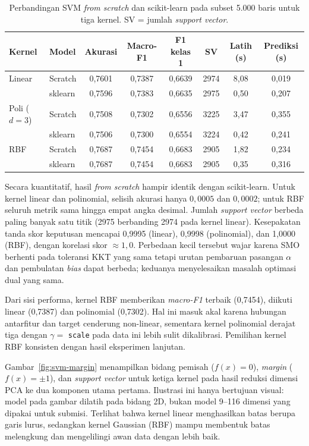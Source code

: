 \begin{table}[htbp]
  \centering
  \caption{Perbandingan SVM \textit{from scratch} dan scikit-learn pada subset
  5.000 baris untuk tiga kernel. SV = jumlah \textit{support vector}.}
  \label{tab:svm-kernel}
  \footnotesize
  \begin{tabular}{llcccccc}
    \toprule
    Kernel & Model & Akurasi & Macro-F1 & F1 kelas 1 & SV & Latih (s) & Prediksi (s) \\
    \midrule
    Linear  & Scratch & 0,7601 & 0,7387 & 0,6639 & 2974 & 8,08 & 0,019 \\
            & sklearn & 0,7596 & 0,7383 & 0,6635 & 2975 & 0,50 & 0,207 \\
    \midrule
    Poli ($d=3$) & Scratch & 0,7508 & 0,7302 & 0,6556 & 3225 & 3,47 & 0,355 \\
            & sklearn & 0,7506 & 0,7300 & 0,6554 & 3224 & 0,42 & 0,241 \\
    \midrule
    RBF     & Scratch & 0,7687 & 0,7454 & 0,6683 & 2905 & 1,82 & 0,234 \\
            & sklearn & 0,7687 & 0,7454 & 0,6683 & 2905 & 0,35 & 0,316 \\
    \bottomrule
  \end{tabular}
\end{table}

Secara kuantitatif, hasil \textit{from scratch} hampir identik dengan
scikit-learn. Untuk kernel linear dan polinomial, selisih akurasi hanya
$0{,}0005$ dan $0{,}0002$; untuk RBF seluruh metrik sama hingga empat angka
desimal. Jumlah \textit{support vector} berbeda paling banyak satu titik
(2975 berbanding 2974 pada kernel linear). Kesepakatan tanda skor keputusan
mencapai 0,9995 (linear), 0,9998 (polinomial), dan 1,0000 (RBF), dengan korelasi
skor $\approx 1{,}0$. Perbedaan kecil tersebut wajar karena SMO berhenti pada
toleransi KKT yang sama tetapi urutan pembaruan pasangan $\alpha$ dan
pembulatan \textit{bias} dapat berbeda; keduanya menyelesaikan masalah
optimasi dual yang sama.

Dari sisi performa, kernel RBF memberikan \textit{macro-F1} terbaik
(0,7454), diikuti linear (0,7387) dan polinomial (0,7302). Hal ini masuk akal
karena hubungan antarfitur dan target cenderung non-linear, sementara kernel
polinomial derajat tiga dengan $\gamma=$ \texttt{scale} pada data ini lebih
sulit dikalibrasi. Pemilihan kernel RBF konsisten dengan hasil eksperimen
lanjutan.

Gambar~\ref{fig:svm-margin} menampilkan bidang pemisah ($f(x)=0$),
\textit{margin} ($f(x)=\pm 1$), dan \textit{support vector} untuk ketiga
kernel pada hasil reduksi dimensi PCA ke dua komponen utama pertama.
Ilustrasi ini hanya bertujuan visual: model pada gambar dilatih pada bidang
2D, bukan model 9--116 dimensi yang dipakai untuk submisi. Terlihat bahwa
kernel linear menghasilkan batas berupa garis lurus, sedangkan kernel
Gaussian (RBF) mampu membentuk batas melengkung dan mengelilingi awan data
dengan lebih baik.

